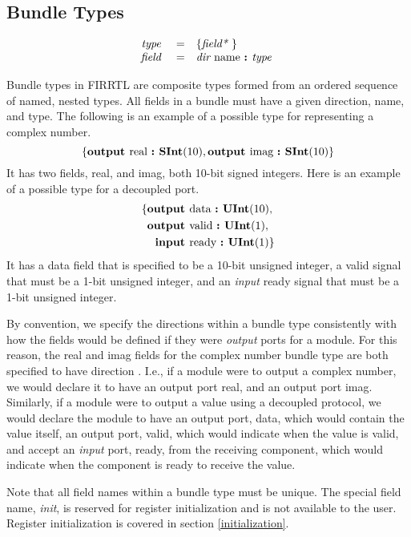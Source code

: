 \documentclass[12pt]{article}
\begin{document}
\subsection{Bundle Types}
\[
\begin{array}{rrl}
\text{\em type\ }       &=     &\{\text{\em field*\ }\}                         \\
\text{\em field\ }      &=     &\text{\em dir\ } \text{name } \text{\bf :\ } \text{\em type\ }        \\
\end{array}
\]

Bundle types in FIRRTL are composite types formed from an ordered sequence of named, nested types.
All fields in a bundle must have a given direction, name, and type.
The following is an example of a possible type for representing a complex number.
\[
\{\text{\bf output\ } \text{real } \text{\bf :\ } \text{\bf SInt}(10),
         \text{\bf output\ } \text{imag } \text{\bf :\ } \text{\bf SInt}(10)\}
\]
It has two fields, real, and imag, both 10-bit signed integers.
Here is an example of a possible type for a decoupled port. 
\[
\begin{aligned}
\{ \text{\bf output\ } &\text{data } \text{\bf :\ } \text{\bf UInt}(10), \\
   \text{\bf output\ } &\text{valid } \text{\bf :\ } \text{\bf UInt}(1), \\
   \text{\bf input\ } &\text{ready } \text{\bf :\ } \text{\bf UInt}(1)\} \\
\end{aligned}
\]
It has a data field that is specified to be a 10-bit unsigned integer, a valid signal that must be a 1-bit unsigned integer, and an {\em input} ready signal that must be a 1-bit unsigned integer.

By convention, we specify the directions within a bundle type consistently with how the fields would be defined if they were {\em output} ports for a module.
For this reason, the real and imag fields for the complex number bundle type are both specified to have direction .
I.e., if a module were to output a complex number, we would declare it to have an output port real, and an output port imag.
Similarly, if a module were to output a value using a decoupled protocol, we would declare the module to have an output port, data, which would contain the value itself, an output port, valid, which would indicate when the value is valid, and accept an {\em input} port, ready, from the receiving component, which would indicate when the component is ready to receive the value.

Note that all field names within a bundle type must be unique.
The special field name, {\em init}, is reserved for register initialization and is not available to the user.
Register initialization is covered in section \ref{initialization}. 
\end{document}
